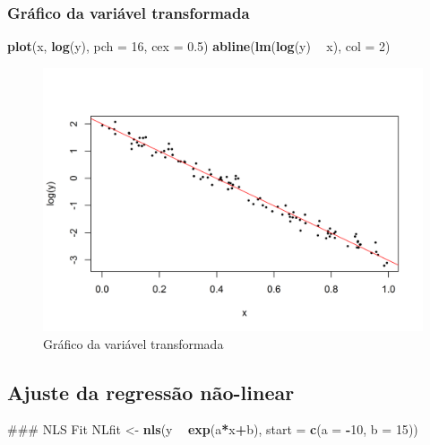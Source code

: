 \documentclass[a4paper]{article}
\newenvironment{Shaded}{\begin{snugshade}}{\end{snugshade}}
\newcommand{\KeywordTok}[1]{\textcolor[rgb]{0.13,0.29,0.53}{\textbf{#1}}}
\newcommand{\DataTypeTok}[1]{\textcolor[rgb]{0.13,0.29,0.53}{#1}}
\newcommand{\DecValTok}[1]{\textcolor[rgb]{0.00,0.00,0.81}{#1}}
\newcommand{\FloatTok}[1]{\textcolor[rgb]{0.00,0.00,0.81}{#1}}
\newcommand{\StringTok}[1]{\textcolor[rgb]{0.31,0.60,0.02}{#1}}
\newcommand{\OperatorTok}[1]{\textcolor[rgb]{0.81,0.36,0.00}{\textbf{#1}}}
\newcommand{\NormalTok}[1]{#1}
\begin{document}
\subsubsection{Gráfico da variável
transformada}\label{grafico-da-variavel-transformada}

\begin{Shaded}
\begin{Highlighting}[]
\KeywordTok{plot}\NormalTok{(x, }\KeywordTok{log}\NormalTok{(y), }\DataTypeTok{pch =} \DecValTok{16}\NormalTok{, }\DataTypeTok{cex =} \FloatTok{0.5}\NormalTok{) }
\KeywordTok{abline}\NormalTok{(}\KeywordTok{lm}\NormalTok{(}\KeywordTok{log}\NormalTok{(y) }\OperatorTok{~}\StringTok{ }\NormalTok{x), }\DataTypeTok{col =} \DecValTok{2}\NormalTok{)}
\end{Highlighting}
\end{Shaded}

\begin{figure}[H]

{\centering \includegraphics[width=0.7\linewidth]{images/graficotrans-1} 

}

\caption{Gráfico da variável transformada}\label{fig:graficotrans}
\end{figure}

\subsection{Ajuste da regressão
não-linear}\label{ajuste-da-regressao-nao-linear}

\begin{Shaded}
\begin{Highlighting}[]
\NormalTok{### NLS Fit}
\NormalTok{NLfit <-}\StringTok{ }\KeywordTok{nls}\NormalTok{(y }\OperatorTok{~}\StringTok{ }\KeywordTok{exp}\NormalTok{(a}\OperatorTok{*}\NormalTok{x}\OperatorTok{+}\NormalTok{b), }\DataTypeTok{start =} \KeywordTok{c}\NormalTok{(}\DataTypeTok{a =} \OperatorTok{-}\DecValTok{10}\NormalTok{, }\DataTypeTok{b =} \DecValTok{15}\NormalTok{)) }
\end{Highlighting}
\end{Shaded}
\end{document}
